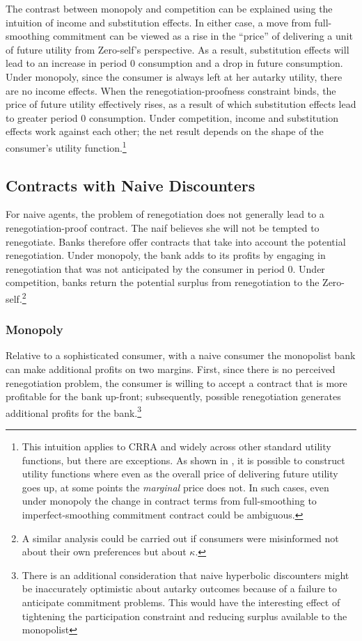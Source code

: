 \documentclass[11pt,english]{article}
\theoremstyle{plain}
\theoremstyle{definition}
\begin{document}
The contrast between monopoly and competition can be explained using
the intuition of income and substitution effects. In either case,
a move from full-smoothing commitment can be viewed as a rise in the
``price'' of delivering a unit of future utility from Zero-self's
perspective. As a result, substitution effects will lead to an increase
in period 0 consumption and a drop in future consumption. Under monopoly,
since the consumer is always left at her autarky utility, there are
no income effects. When the renegotiation-proofness constraint binds,
the price of future utility effectively rises, as a result of which
substitution effects lead to greater period 0 consumption. Under competition,
income and substitution effects work against each other; the net result
depends on the shape of the consumer's utility function.\footnote{This intuition applies to CRRA and widely across other standard utility
functions, but there are exceptions. As shown in \citet{basu2020},
it is possible to construct utility functions where even as the overall
price of delivering future utility goes up, at some points the \emph{marginal}
price does not. In such cases, even under monopoly the change in contract
terms from full-smoothing to imperfect-smoothing commitment contract
could be ambiguous.}

\subsection{Contracts with Naive Discounters}

For naive agents, the problem of renegotiation does not generally
lead to a renegotiation-proof contract. The naif believes she will
not be tempted to renegotiate. Banks therefore offer contracts that
take into account the potential renegotiation. Under monopoly, the
bank adds to its profits by engaging in renegotiation that was not
anticipated by the consumer in period 0. Under competition, banks
return the potential surplus from renegotiation to the Zero-self.\footnote{A similar analysis could be carried out if consumers were misinformed
not about their own preferences but about $\kappa$.}

\subsubsection{Monopoly}

Relative to a sophisticated consumer, with a naive consumer the monopolist
bank can make additional profits on two margins. First, since there
is no perceived renegotiation problem, the consumer is willing to
accept a contract that is more profitable for the bank up-front; subsequently,
possible renegotiation generates additional profits for the bank.\footnote{There is an additional consideration \textendash{} that naive hyperbolic
discounters might be inaccurately optimistic about autarky outcomes
because of a failure to anticipate commitment problems. This would
have the interesting effect of tightening the participation constraint
and reducing surplus available to the monopolist}
\end{document}
